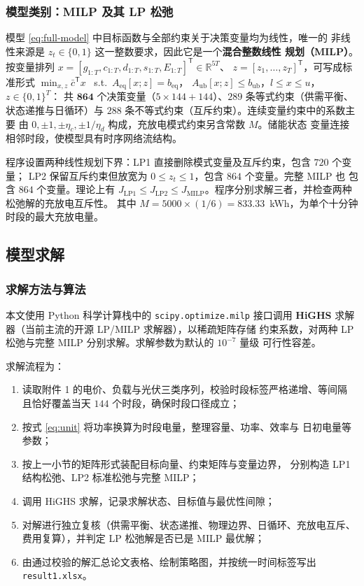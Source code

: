 \documentclass[withoutpreface,bwprint]{cumcmthesis}
\begin{document}
\subsubsection{模型类别：MILP 及其 LP 松弛}

模型 \eqref{eq:full-model} 中目标函数与全部约束关于决策变量均为线性，唯一的
非线性来源是 $z_t \in \{0,1\}$ 这一整数要求，因此它是一个\textbf{混合整数线性
规划（MILP）}。按变量排列
$x=[g_{1:T},c_{1:T},d_{1:T},s_{1:T},E_{1:T}]^{\mathsf T}\in\mathbb R^{5T}$、
$z=[z_1,\dots,z_T]^{\mathsf T}$，可写成标准形式
$\min_{x,z}\bar c^{\mathsf T}x$ \ s.t.\ $A_{\mathrm{eq}}[x;z]=b_{\mathrm{eq}}$，
$A_{\mathrm{ub}}[x;z]\le b_{\mathrm{ub}}$，$l\le x\le u$，$z\in\{0,1\}^T$：
共 $\mathbf{864}$ 个决策变量（$5\times144+144$）、$289$ 条等式约束（供需平衡、
状态递推与日循环）与 $288$ 条不等式约束（互斥约束）。连续变量约束中的系数主要
由 $0,\pm1,\pm\eta_c,\pm1/\eta_d$ 构成，充放电模式约束另含常数 $M$。储能状态
变量连接相邻时段，使模型具有时序网络流结构。

程序设置两种线性规划下界：LP1 直接删除模式变量及互斥约束，包含 $720$ 个变量；
LP2 保留互斥约束但放宽为 $0\le z_t\le1$，包含 $864$ 个变量。完整 MILP 也
包含 $864$ 个变量。理论上有 $J_{\mathrm{LP1}}\le J_{\mathrm{LP2}}\le
J_{\mathrm{MILP}}$。程序分别求解三者，并检查两种松弛解的充放电互斥性。
其中 $M=5000\times(1/6)=833.33$~kWh，为单个十分钟时段的最大充放电量。
\subsection{模型求解}

\subsubsection{求解方法与算法}

本文使用 Python 科学计算栈中的 \texttt{scipy.optimize.milp} 接口调用
\textbf{HiGHS} 求解器（当前主流的开源 LP/MILP 求解器），以稀疏矩阵存储
约束系数，对两种 LP 松弛与完整 MILP 分别求解。求解参数为默认的 $10^{-7}$ 量级
可行性容差。

求解流程为：

\begin{enumerate}
  \item 读取附件 1 的电价、负载与光伏三类序列，校验时段标签严格递增、等间隔
        且恰好覆盖当天 $144$ 个时段，确保时段口径成立；
  \item 按式 \eqref{eq:unit} 将功率换算为时段电量，整理容量、功率、效率与
        日初电量等参数；
  \item 按上一小节的矩阵形式装配目标向量、约束矩阵与变量边界，
        分别构造 LP1 结构松弛、LP2 标准松弛与完整 MILP；
  \item 调用 HiGHS 求解，记录求解状态、目标值与最优性间隙；
  \item 对解进行独立复核（供需平衡、状态递推、物理边界、日循环、充放电互斥、
        费用复算），并判定 LP 松弛解是否已是 MILP 最优解；
  \item 由通过校验的解汇总论文表格、绘制策略图，并按统一时间标签写出
        \texttt{result1.xlsx}。
\end{enumerate}
\end{document}
